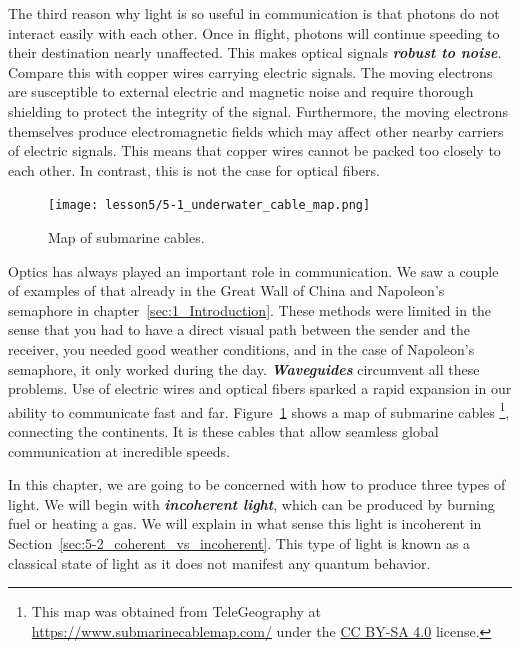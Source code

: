 The third reason why light is so useful in communication is that photons do not interact easily with each other.
Once in flight, photons will continue speeding to their destination nearly unaffected.
This makes optical signals \textit{\textbf{robust to noise}}.
Compare this with copper wires carrying electric signals.
The moving electrons are susceptible to external electric and magnetic noise and require thorough shielding to protect the integrity of the signal.
Furthermore, the moving electrons themselves produce electromagnetic fields which may affect other nearby carriers of electric signals.
This means that copper wires cannot be packed too closely to each other.
In contrast, this is not the case for optical fibers.

\begin{figure}[t]
    \centering
    \texttt{[image: lesson5/5-1\_underwater\_cable\_map.png]}
    \caption[Underwater cable map]{Map of submarine cables.}
    \label{fig:5-1_underwater_cable_map}
\end{figure}

Optics has always played an important role in communication.
We saw a couple of examples of that already in the Great Wall of China and Napoleon's semaphore in chapter~\ref{sec:1_Introduction}.
These methods were limited in the sense that you had to have a direct visual path between the sender and the receiver, you needed good weather conditions, and in the case of Napoleon's semaphore, it only worked during the day.
\textit{\textbf{Waveguides}} circumvent all these problems.
Use of electric wires and optical fibers sparked a rapid expansion in our ability to communicate fast and far.
Figure~\ref{fig:5-1_underwater_cable_map} shows a map of submarine cables \footnote{This map was obtained from TeleGeography at \href{https://www.submarinecablemap.com/}{https://www.submarinecablemap.com/} under the \href{https://creativecommons.org/licenses/by-sa/4.0/}{CC BY-SA 4.0} license.}, connecting the continents.
It is these cables that allow seamless global communication at incredible speeds.

In this chapter, we are going to be concerned with how to produce three types of light.
We will begin with \textit{\textbf{incoherent light}}, which can be produced by burning fuel or heating a gas.
We will explain in what sense this light is incoherent in Section~\ref{sec:5-2_coherent_vs_incoherent}.
This type of light is known as a classical state of light as it does not manifest any quantum behavior.

